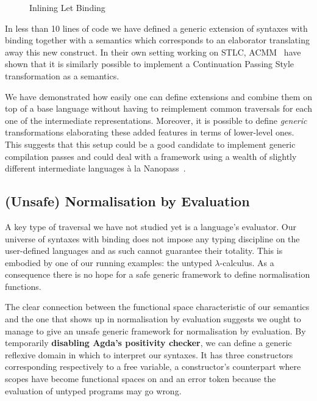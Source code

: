 \begin{figure}[h]
\caption{Inlining Let Binding}
\end{figure}

In less than 10 lines of code we have defined a generic extension of
syntaxes with binding together with a semantics which corresponds
to an elaborator translating away this new construct. In their
own setting working on STLC, ACMM~\citeyear{allais2017type} have
shown that it is similarly possible to implement a Continuation
Passing Style transformation as a semantics.

We have demonstrated how easily one can define extensions and combine
them on top of a base language without having to reimplement common
traversals for each one of the intermediate representations. Moreover,
it is possible to define \emph{generic} transformations elaborating
these added features in terms of lower-level ones. This suggests that
this setup could be a good candidate to implement generic compilation
passes and could deal with a framework using a wealth of slightly
different intermediate languages à la Nanopass~\cite{Keep:2013:NFC:2544174.2500618}.

\subsection{(Unsafe) Normalisation by Evaluation}\label{section:nbyeval}

A key type of traversal we have not studied yet is a language's
evaluator. Our universe of syntaxes with binding does not impose
any typing discipline on the user-defined languages and as such
cannot guarantee their totality. This is embodied by one of our running
examples: the untyped $\lambda$-calculus. As a consequence there
is no hope for a safe generic framework to define normalisation
functions.

The clear connection between the  functional space
characteristic of our semantics and the one that shows up in
normalisation by evaluation suggests we ought to manage to
give an unsafe generic framework for normalisation by evaluation.
By temporarily \textbf{disabling Agda's positivity checker},
we can define a generic reflexive domain  in which to
interpret our syntaxes. It has three constructors corresponding
respectively to a free variable, a constructor's counterpart where
scopes have become  functional spaces on  and
an error token because the evaluation of untyped programs may go wrong.

